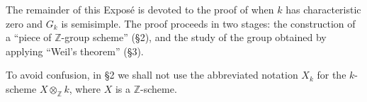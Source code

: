 The remainder of this Exposé is devoted to the proof of  when \(k\) has
characteristic zero and \(G_k\) is semisimple. The proof proceeds in two
stages: the construction of a ``piece of \(\mathbb Z\)-group scheme''
(\S2), and the study of the group obtained by applying ``Weil's theorem''
(\S3).

To avoid confusion, in \S2 we shall not use the abbreviated notation \(X_k\)
for the \(k\)-scheme \(X\otimes_{\mathbb Z}k\), where \(X\) is a
\(\mathbb Z\)-scheme.

